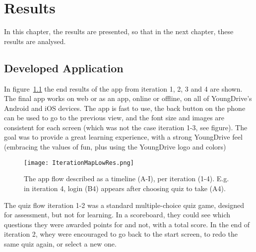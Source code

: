 \chapter{Results}\label{cha:Research}
%


In this chapter, the results are presented, so that in the next chapter, these results are analysed. 

%

\section{Developed Application}

  In figure~\ref{fig:iteration-map} the end results of the app from iteration 1, 2, 3 and 4 are shown. The final app works on web or as an app, online or offline, on all of YoungDrive's Android and iOS devices. The app is fast to use, the back button on the phone can be used to go to the previous view, and the font size and images are consistent for each screen (which was not the case iteration 1-3, see figure). The goal was to provide a great learning experience, with a strong YoungDrive feel (embracing the values of fun, plus using the YoungDrive logo and colors)

  \begin{figure}[h]
    \centering
    \texttt{[image: IterationMapLowRes.png]}
    \caption{The app flow described as a timeline (A-I), per iteration (1-4). E.g. in iteration 4, login (B4) appears after choosing quiz to take (A4).}
    \label{fig:iteration-map}
  \end{figure}


  The quiz flow iteration 1-2 was a standard multiple-choice quiz game, designed for assessment, but not for learning. In a scoreboard, they could see which questions they were awarded points for and not, with a total score. In the end of iteration 2, whey were encouraged to go back to the start screen, to redo the same quiz again, or select a new one.

  
  

